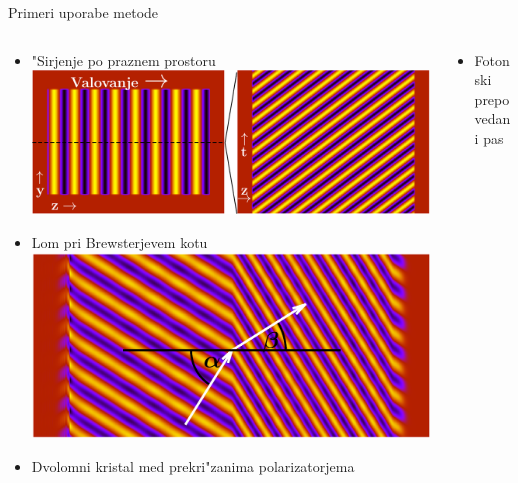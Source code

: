 \documentclass{beamer}
\begin{document}
\begin{frame}{Primeri uporabe metode}
\begin{columns}[c]

\begin{column}[T]{.46\textwidth}
\begin{itemize}
 \item "Sirjenje po praznem prostoru
 \includegraphics[width=.6\textwidth]{./Slike/empty}
 
 \item Lom pri Brewsterjevem kotu
 \includegraphics[width=.6\textwidth]{./Slike/refraction}
 
 
  \item Dvolomni kristal med prekri"zanima polarizatorjema\\
  \resizebox{.65\textwidth}{!}{}

\end{itemize}

\end{column}

\begin{column}[T]{.5\textwidth}
\begin{itemize}
 \item Fotonski prepovedani pas
 \begin{center}
   \resizebox{.7\textwidth}{!}{\footnotesize } \\
    \hspace{-1cm}  \;	
  \resizebox{.6\textwidth}{!}{}
  \end{center}
  

\end{itemize}
\end{column}
\end{columns}
\end{frame}
\end{document}
